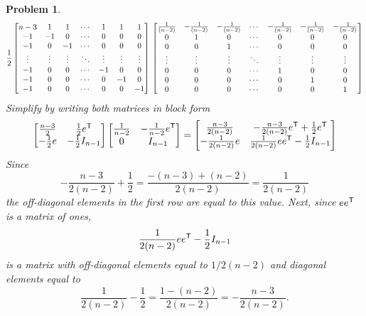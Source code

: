 \documentclass{article}
\theoremstyle{pprop}
\newtheorem{problem}{Problem}[section]
\begin{document}
\begin{problem}
$$
\frac12
\begin{bmatrix}
n-3 & 1 & 1 & \cdots & 1 & 1 & 1 \\
-1 & -1 & 0 & \cdots & 0 & 0 & 0 \\
-1 & 0 & -1 & \cdots & 0 & 0 & 0 \\
\vdots & \vdots & \vdots & \ddots & \vdots & \vdots & \vdots \\
-1 & 0 & 0 & \cdots & -1 & 0 & 0 \\
-1 & 0 & 0 & \cdots & 0 & -1 & 0 \\
-1 & 0 & 0 & \cdots & 0 & 0 & -1 \\
\end{bmatrix} \\
\begin{bmatrix}
\frac{1}{(n-2)} & -\frac{1}{(n-2)} & -\frac{1}{(n-2)} & \cdots & -\frac{1}{(n-2)} & -\frac{1}{(n-2)} & -\frac{1}{(n-2)} \\
0 & 1 & 0 & \cdots & 0 & 0 & 0 \\
0 & 0 & 1 & \cdots & 0 & 0 & 0 \\
\vdots & \vdots & \vdots & \ddots & \vdots & \vdots & \vdots \\
0 & 0 & 0 & \cdots & 1 & 0 & 0 \\
0 & 0 & 0 & \cdots & 0 & 1 & 0 \\
0 & 0 & 0 & \cdots & 0 & 0 & 1 \\
\end{bmatrix}
$$
Simplify by writing both matrices in block form
$$
\begin{bmatrix}
\frac{n-3}{2} & \frac12 e^{\sf T} \\
-\frac12 e & - \frac12 I_{n-1}
\end{bmatrix}
\begin{bmatrix}
\frac{1}{n-2} & -\frac{1}{n-2} e^{\sf T} \\
0  &  I_{n-1}
\end{bmatrix}=
\begin{bmatrix}
\frac{n-3}{2(n-2)} & -\frac{n-3}{2(n-2)}e^{\sf T}+\frac12 e^{\sf T} \\
-\frac{1}{2(n-2)}e & \frac{1}{2(n-2)}ee^{\sf T}-\frac12 I_{n-1 }
\end{bmatrix}
$$
Since
$$
-\frac{n-3}{2(n-2)}+\frac12=\frac{-(n-3)+(n-2)}{2(n-2)}=\frac{1}{2(n-2)}
$$
the off-diagonal elements in the first row are equal to this value. Next, since $ee^{\sf T}$ is a matrix of ones,
$$
\frac{1}{2(n-2)}ee^{\sf T}-\frac12 I_{n-1 }
$$
is a matrix with off-diagonal elements equal to $1/2(n-2)$ and diagonal elements equal to 
$$
\frac{1}{2(n-2)}-\frac12 = \frac{1-(n-2)}{2(n-2)}=-\frac{n-3}{2(n-2)}.
$$
\end{problem}
\end{document}
